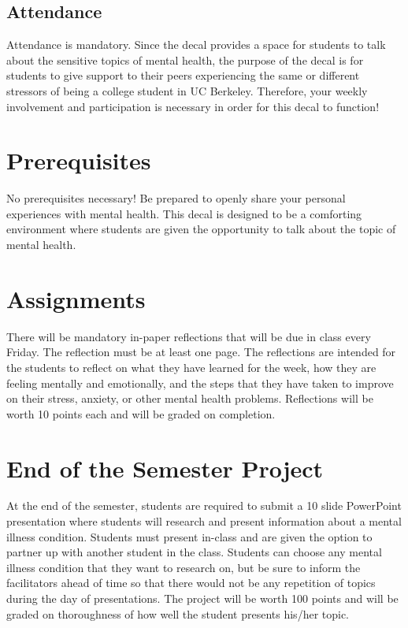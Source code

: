 \documentclass[fleqn,10pt]{wlscirep}
\begin{document}
\subsection*{Attendance}
Attendance is mandatory. Since the decal provides a space for students to talk about the sensitive topics of mental health, the purpose of the decal is for students to give support to their peers experiencing the same or different stressors of being a college student in UC Berkeley. Therefore, your weekly involvement and participation is necessary in order for this decal to function! 

\section*{Prerequisites}
No prerequisites necessary! Be prepared to openly share your personal experiences with mental health. This decal is designed to be a comforting environment where students are given the opportunity to talk about the topic of mental health. 

\section*{Assignments}
There will be mandatory in-paper reflections that will be due in class every Friday. The reflection must be at least one page. The reflections are intended for the students to reflect on what they have learned for the week, how they are feeling mentally and emotionally, and the steps that they have taken to improve on their stress, anxiety, or other mental health problems. Reflections will be worth 10 points each and will be graded on completion.

\section*{End of the Semester Project}
At the end of the semester, students are required to submit a 10 slide PowerPoint presentation where students will research and present information about a mental illness condition. Students must present in-class and are given the option to partner up with another student in the class. Students can choose any mental illness condition that they want to research on, but be sure to inform the facilitators ahead of time so that there would not be any repetition of topics during the day of presentations. The project will be worth 100 points and will be graded on thoroughness of how well the student presents his/her topic. 
\end{document}
